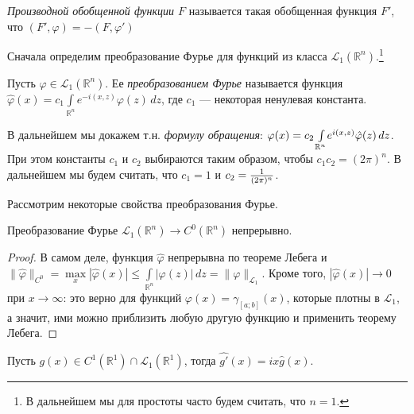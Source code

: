 \documentclass[10pt,titlepage, a4paper]{article}
\begin{document}
\begin{defen}
\emph{Производной обобщенной функции $F$} называется такая
обобщенная функция $F'$, что $(F',\varphi)=-(F,\varphi')$
\end{defen}



Сначала определим преобразование Фурье для функций из класса
$\mathcal{L}_1(\mathbb{R}^n)$.\footnote{В дальнейшем мы для простоты
часто будем считать, что $n=1$.}

\begin{defen}
Пусть $\varphi\in\mathcal{L}_1(\mathbb{R}^n)$. Ее
\emph{преобразованием Фурье} называется функция
$\hat{\varphi}(x)=c_1\int\limits_{\mathbb{R}^n}\!e^{-i(x,z)}\varphi(z)\,dz$,
где $c_1$ --- некоторая ненулевая константа.
\end{defen}

\begin{zam}
В дальнейшем мы докажем т.н. \emph{формулу обращения}:
$\varphi(x)\p=c_2\int\limits_{\mathbb{R}^n}\!e^{i(x,z)}\hat{\varphi}(z)\,dz$.
При этом константы $c_1$ и $c_2$ выбираются таким образом, чтобы
$c_1c_2=(2\pi)^n$. В дальнейшем мы будем считать, что $c_1=1$ и
$c_2\p=\frac{1}{(2\pi)^n}$.
\end{zam}

Рассмотрим некоторые свойства преобразования Фурье.

\begin{theorem}
Преобразование Фурье $\mathcal{L}_1(\mathbb{R}^n)\to
C^0(\mathbb{R}^n)$ непрерывно.
\end{theorem}

\begin{proof}
В самом деле, функция $\hat{\varphi}$ непрерывна по теореме Лебега и
$\|\hat{\varphi}\|_{C^0}=\max\limits_x|\hat{\varphi}(x)|\leqslant\int\limits_
{\mathbb{R}^n}\!|\varphi(z)|\,dz=\|\varphi\|_{\mathcal{L}_1}$. Кроме
того, $|\hat{\varphi}(x)|\to 0$ при $x\to\infty$: это верно для
функций $\varphi(x)=\gamma_{[a;b]}(x)$, которые плотны в
$\mathcal{L}_1$, а значит, ими можно приблизить любую другую функцию
и применить теорему Лебега.
\end{proof}

\begin{theorem}
Пусть $g(x)\in C^1(\mathbb{R}^1)\cap\mathcal{L}_1(\mathbb{R}^1)$,
тогда $\widehat{g'}(x)=ix\hat{g}(x)$.
\end{theorem}
\end{document}
